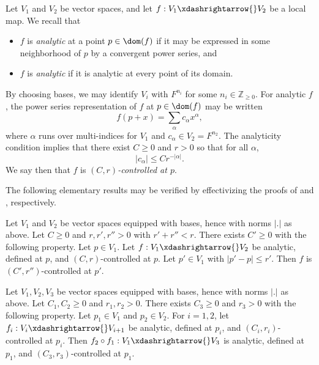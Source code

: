Let $V_1$ and $V_2$ be vector spaces, and let $f : V_1 \xdashrightarrow{} V_2$ be a local map.  We recall that
\begin{itemize}
\item $f$ is \emph{analytic} at a point $p \in \dom(f)$ if it may be expressed in some neighborhood of $p$ by a convergent power series, and
\item $f$ is \emph{analytic} if it is analytic at every point of its domain.
\end{itemize}
By choosing bases, we may identify $V_i$ with $F^{n_i}$ for some $n_i \in \mathbb{Z}_{\geq 0}$.  For analytic $f$, the power series representation of $f$ at $p \in \dom(f)$ may be written
\begin{equation}\label{eq:phip-+-x}
  f(p + x) = \sum_{\alpha } c_\alpha x^\alpha,
\end{equation}
where $\alpha$ runs over multi-indices for $V_1$ and $c_\alpha \in V_2 = F^{n_2}$.  The analyticity condition implies that there exist $C \geq 0$ and $r > 0$ so that for all $\alpha$,
\begin{equation}\label{eq:c_alpha-leq-c_0}
  |c_\alpha| \leq C r^{-|\alpha|}.
\end{equation}
We say then that $f$ is \emph{$(C,r)$-controlled at $p$}.

The following elementary results may be verified by effectivizing the proofs of \cite[p69, Theorem]{MR2179691} and \cite[p70, Theorem]{MR2179691}, respectively.
\begin{lemma}\label{lem:standard2:elementary-analytic-translate}
  Let $V_1$ and $V_2$ be vector spaces equipped with bases, hence with norms $|.|$ as above.  Let $C \geq 0$ and $r, r', r'' > 0$ with $r' + r'' < r$.  There exists $C' \geq 0$ with the following property.  Let $p \in V_1$.  Let $f : V_1 \xdashrightarrow{} V_2$ be analytic, defined at $p$, and $(C,r)$-controlled at $p$.  Let $p' \in V_1$ with $|p' - p| \leq r'$.  Then $f$ is $(C',r'')$-controlled at $p'$.
\end{lemma}
\begin{lemma}\label{lem:standard2:elementary-analytic-compose}
  Let $V_1, V_2, V_3$ be vector spaces equipped with bases, hence with norms $|.|$ as above.  Let $C_1, C_2 \geq 0$ and $r_1, r_2 > 0$.  There exists $C_3 \geq 0$ and $r_3 > 0$ with the following property.  Let $p_1 \in V_1$ and $p_2 \in V_2$.  For $i=1,2$, let $f_i : V_i \xdashrightarrow{} V_{i+1}$ be analytic, defined at $p_i$, and $(C_i,r_i)$-controlled at $p_i$.  Then $f_2 \circ f_1 : V_1 \xdashrightarrow{} V_3$ is analytic, defined at $p_1$, and $(C_3,r_3)$-controlled at $p_1$.
\end{lemma}


